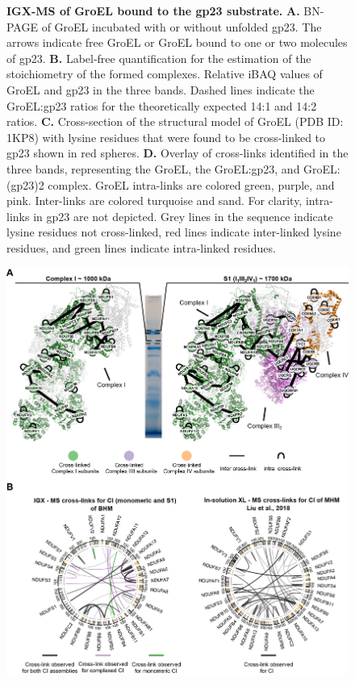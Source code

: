 \begin{subappendices}
\begin{figure}[hbt]
		\caption{\textbf{IGX-MS of GroEL bound to the gp23 substrate.} \textbf{A.} BN-PAGE of GroEL incubated with or without unfolded gp23. The arrows indicate free GroEL or GroEL bound to one or two molecules of gp23. \textbf{B.} Label-free quantification for the estimation of the stoichiometry of the formed complexes. Relative iBAQ values of GroEL and gp23 in the three bands. Dashed lines indicate the GroEL:gp23 ratios for the theoretically expected 14:1 and 14:2 ratios. \textbf{C.} Cross-section of the structural model of GroEL (PDB ID: 1KP8) with lysine residues that were found to be cross-linked to gp23 shown in red spheres. \textbf{D.} Overlay of cross-links identified in the three bands, representing the GroEL, the GroEL:gp23, and GroEL:(gp23)2 complex. GroEL intra-links are colored green, purple, and pink. Inter-links are colored turquoise and sand. For clarity, intra-links in gp23 are not depicted. Grey lines in the sequence indicate lysine residues not cross-linked, red lines indicate inter-linked lysine residues, and green lines indicate intra-linked residues.}
		\label{fig:ch2_app_fig4}
	\end{figure}
	\begin{figure}[hb]
		\center
		\includegraphics[]{Chapter.2/Figures/EV_Figure1.png}

\end{figure}
\end{subappendices}
